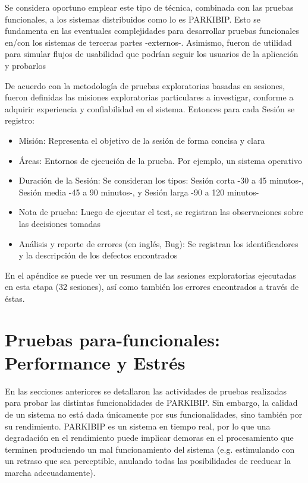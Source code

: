Se considera oportuno emplear este tipo de técnica, combinada con las pruebas funcionales, a los sistemas distribuidos como lo es PARKIBIP. Esto se fundamenta en las eventuales complejidades para desarrollar pruebas funcionales en/con los sistemas de terceras partes -externos-. Asimismo, fueron de utilidad para simular flujos de usabilidad que podrían seguir los usuarios de la aplicación y probarlos

De acuerdo con la metodología de pruebas exploratorias basadas en sesiones, fueron definidas las misiones exploratorias particulares a investigar, conforme a adquirir experiencia y confiabilidad en el sistema. Entonces para cada Sesión se registro:
\begin{itemize}
    \item Misión: Representa el objetivo de la sesión de forma concisa y clara
    \item Áreas: Entornos de ejecución de la prueba. Por ejemplo, un sistema operativo
    \item Duración de la Sesión: Se consideran los tipos: Sesión corta -30 a 45 minutos-, Sesión media -45 a 90 minutos-, y Sesión larga -90 a 120 minutos-
    \item Nota de prueba: Luego de ejecutar el test, se registran las observaciones sobre las decisiones tomadas
    \item Análisis y reporte de errores (en inglés, Bug): Se registran los identificadores y la descripción de los defectos encontrados
\end{itemize}

En el apéndice  se puede ver un resumen de las sesiones exploratorias ejecutadas en esta etapa (32 sesiones), así como también los errores encontrados a través de éstas. 

\section{Pruebas para-funcionales: Performance y Estrés}


En las secciones anteriores se detallaron las actividades de pruebas realizadas para probar las distintas funcionalidades de PARKIBIP. Sin embargo, la calidad de un sistema no está dada únicamente por sus funcionalidades, sino también por su rendimiento. PARKIBIP es un sistema en tiempo real, por lo que una degradación en el rendimiento puede implicar demoras en el procesamiento que terminen produciendo un mal funcionamiento del sistema (e.g. estimulando con un retraso que sea perceptible, anulando todas las posibilidades de reeducar la marcha adecuadamente).

